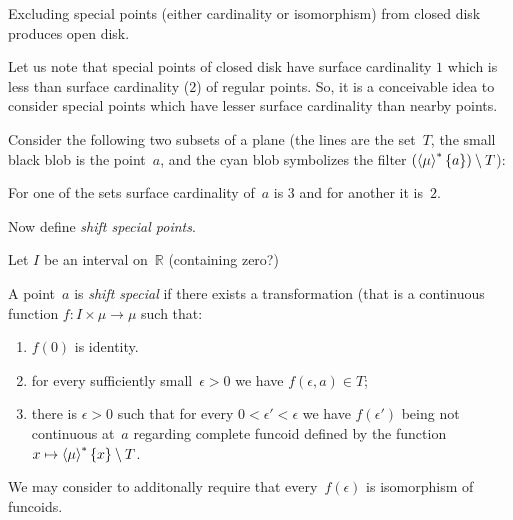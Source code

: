 \begin{xca}
Excluding special points (either cardinality or isomorphism) from closed disk
produces open disk.
\end{xca}

Let us note that special points of closed disk have surface cardinality
$1$ which is less than surface cardinality ($2$) of regular points.
So, it is a conceivable idea to consider special points which have
lesser surface cardinality than nearby points.

Consider the following two subsets of a plane (the lines are the
set~$T$, the small black blob is the point~$a$, and the cyan
blob symbolizes the filter $(\left\langle \mu\right\rangle ^{\ast}\{a\})\setminus T$):



For one of the sets surface cardinality of~$a$ is $3$ and for
another it is~$2$.

Now define \emph{shift special points}.

Let $I$ be an interval on~$\mathbb{R}$ (containing zero?)

A point~$a$ is \emph{shift special} if there exists a transformation
(that is a continuous function $f:I\times\mu\to\mu$ such that:
\begin{enumerate}
  \item $f(0)$ is identity. 
  \item for every sufficiently small~$\epsilon>0$ we have $f(\epsilon,a)\in T$;
  \item there is $\epsilon>0$ such that for every $0<\epsilon'<\epsilon$ we have
    $f(\epsilon')$ being not continuous at~$a$ regarding complete funcoid
    defined by the function $x\mapsto\left\langle \mu\right\rangle ^{\ast}\{x\}\setminus T$.
\end{enumerate}

We may consider to additonally require that every~$f(\epsilon)$ is isomorphism
of funcoids.

